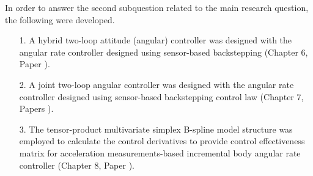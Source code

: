 In order to answer the second subquestion related to the main research question, the following were developed.\\
\begin{enumerate}
\item[1.] A hybrid two-loop attitude (angular) controller was designed with the angular rate controller designed using sensor-based backstepping (Chapter 6, Paper \cite{lgsunhyb2013}). 
\item[2.] A joint two-loop angular controller was designed with the angular rate controller designed using sensor-based backstepping control law (Chapter 7, Papers \cite{sunlgjointSBB13c,lgsunjJSBB2013}).
\item[3.] The tensor-product multivariate simplex B-spline model structure was employed to calculate the control derivatives to provide control effectiveness matrix for acceleration measurements-based incremental body angular rate controller (Chapter 8, Paper \cite{liguosun2014c}).
\end{enumerate}

